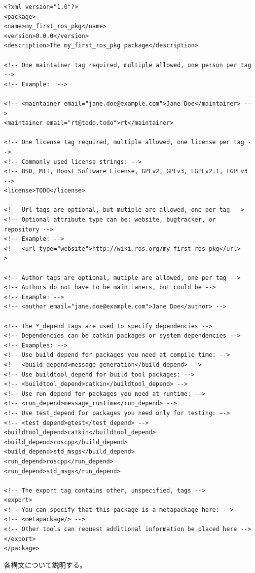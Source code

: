\begin{lstlisting}[language=ROS]
<?xml version="1.0"?>
<package>
<name>my_first_ros_pkg</name>
<version>0.0.0</version>
<description>The my_first_ros_pkg package</description>

<!-- One maintainer tag required, multiple allowed, one person per tag -->
<!-- Example:  -->

<!-- <maintainer email="jane.doe@example.com">Jane Doe</maintainer> -->
<maintainer email="rt@todo.todo">rt</maintainer>

<!-- One license tag required, multiple allowed, one license per tag -->
<!-- Commonly used license strings: -->
<!-- BSD, MIT, Boost Software License, GPLv2, GPLv3, LGPLv2.1, LGPLv3 -->
<license>TODO</license>

<!-- Url tags are optional, but mutiple are allowed, one per tag -->
<!-- Optional attribute type can be: website, bugtracker, or repository -->
<!-- Example: -->
<!-- <url type="website">http://wiki.ros.org/my_first_ros_pkg</url> -->

<!-- Author tags are optional, mutiple are allowed, one per tag -->
<!-- Authors do not have to be maintianers, but could be -->
<!-- Example: -->
<!-- <author email="jane.doe@example.com">Jane Doe</author> -->

<!-- The *_depend tags are used to specify dependencies -->
<!-- Dependencies can be catkin packages or system dependencies -->
<!-- Examples: -->
<!-- Use build_depend for packages you need at compile time: -->
<!-- <build_depend>message_generation</build_depend> -->
<!-- Use buildtool_depend for build tool packages: -->
<!-- <buildtool_depend>catkin</buildtool_depend> -->
<!-- Use run_depend for packages you need at runtime: -->
<!-- <run_depend>message_runtime</run_depend> -->
<!-- Use test_depend for packages you need only for testing: -->
<!-- <test_depend>gtest</test_depend> -->
<buildtool_depend>catkin</buildtool_depend>
<build_depend>roscpp</build_depend>
<build_depend>std_msgs</build_depend>
<run_depend>roscpp</run_depend>
<run_depend>std_msgs</run_depend>

<!-- The export tag contains other, unspecified, tags -->
<export>
<!-- You can specify that this package is a metapackage here: -->
<!-- <metapackage/> -->
<!-- Other tools can request additional information be placed here -->
</export>
</package>
\end{lstlisting}

各構文について説明する。

